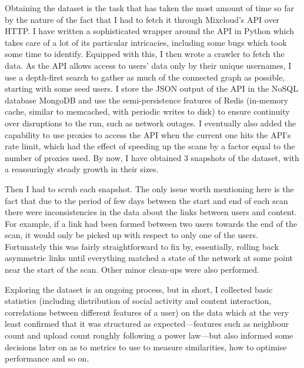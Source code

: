 \documentclass[a4paper,11pt,titlepage]{article}
\begin{document}
Obtaining the dataset is the task that has taken the most amount of time so far by the nature of the fact that I had to fetch it through Mixcloud's API over HTTP\@. I have written a sophisticated wrapper around the API in Python which takes care of a lot of its particular intricacies, including some bugs which took some time to identify. Equipped with this, I then wrote a crawler to fetch the data. As the API allows access to users' data only by their unique usernames, I use a depth-first search to gather as much of the connected graph as possible, starting with some seed users. I store the JSON output of the API in the NoSQL database MongoDB and use the semi-persistence features of Redis (in-memory cache, similar to memcached, with periodic writes to disk) to ensure continuity over disruptions to the run, such as network outages. I eventually also added the capability to use proxies to access the API when the current one hits the API's rate limit, which had the effect of speeding up the scans by a factor equal to the number of proxies used. By now, I have obtained 3 snapshots of the dataset, with a reassuringly steady growth in their sizes.

Then I had to scrub each snapshot. The only issue worth mentioning here is the fact that due to the period of few days between the start and end of each scan there were inconsistencies in the data about the links between users and content. For example, if a link had been formed between two users towards the end of the scan, it would only be picked up with respect to only one of the users. Fortunately this was fairly straightforward to fix by, essentially, rolling back asymmetric links until everything matched a state of the network at some point near the start of the scan. Other minor clean-ups were also performed.

Exploring the dataset is an ongoing process, but in short, I collected basic statistics (including distribution of social activity and content interaction, correlations between different features of a user) on the data which at the very least confirmed that it was structured as expected---features such as neighbour count and upload count roughly following a power law---but also informed some decisions later on as to metrics to use to measure similarities, how to optimise performance and so on.
\end{document}
